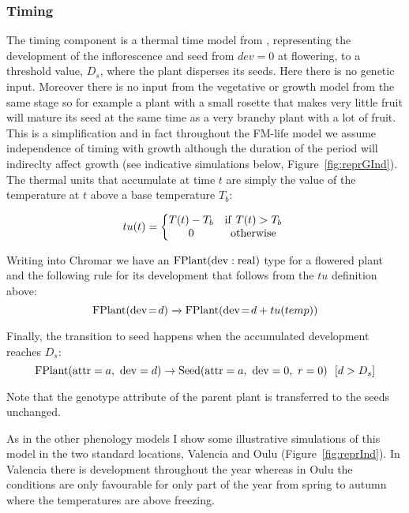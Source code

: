 \subsubsection*{Timing}
\label{timing-1}

The timing component is a thermal time model from
\citet{burghardt_modeling_2015}, representing the development of the
inflorescence and seed from \(dev = 0\) at flowering, to a threshold value,
\(D_{s}\), where the plant disperses its seeds. Here there is no genetic
input. Moreover there is no input from the vegetative or growth model from the
same stage so for example a plant with a small rosette that makes very little
fruit will mature its seed at the same time as a very branchy plant with a lot
of fruit. This is a simplification and in fact throughout the FM-life model we
assume independence of timing with growth although the duration of the period
will indireclty affect growth (see indicative simulations below,
Figure~\ref{fig:reprGInd}). The thermal units that accumulate at time \(t\) are
simply the value of the temperature at \(t\) above a base temperature \(T_{b}\):

\[tu(t) = \left\{ \begin{matrix}
T(t) - T_{b} & \mathrm{if\ }T(t) > T_{b} \\
0 & \mathrm{otherwise} \\
\end{matrix} \right.\ \]

Writing into Chromar we have an
\(\mathrm{FPlant}(\mathrm{dev}:\mathrm{real})\) type for a flowered plant and
the following rule for its development that follows from the
\(tu\) definition above:
$$
\mathrm{FPlant}( \mathrm{dev} \! = \! {d} ) \xrightarrow{} \mathrm{FPlant}(\mathrm{dev} \! = \! {d + tu(temp)})
$$

Finally, the transition to seed happens when the accumulated development
reaches \(D_{s}\):
\[\mathrm{FPlant}( \mathrm{attr} = a,\mathrm{\ dev} = d ) \rightarrow \mathrm{Seed}( \mathrm{attr} = a,\ \mathrm{dev} = 0,\ r = 0 )\ \ \lbrack d > D_{s}\rbrack\]

Note that the genotype attribute of the parent plant is transferred to
the seeds unchanged.

As in the other phenology models I show some illustrative simulations of this
model in the two standard locations, Valencia and Oulu
(Figure~\ref{fig:reprInd}). In Valencia there is development throughout the year
whereas in Oulu the conditions are only favourable for only part of the year
from spring to autumn where the temperatures are above freezing.

